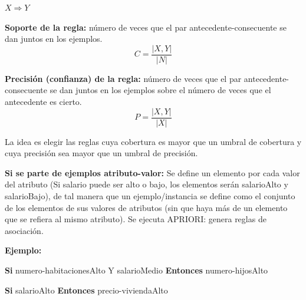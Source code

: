 \documentclass[12pt, twoside, openright]{report} %
\begin{document}
\begin{center}
	$X \Rightarrow Y$
\end{center}

\textbf{Soporte de la regla:} número de veces que el par antecedente-consecuente se dan juntos en los ejemplos.
$$C = \frac{|X, Y|}{|N|}$$

\textbf{Precisión (confianza) de la regla:} número de veces que el par antecedente-consecuente se dan juntos en los ejemplos sobre el número de veces que el antecedente es cierto.
$$P = \frac{|X, Y|}{|X|}$$

La idea es elegir las reglas cuya cobertura es mayor que un umbral de cobertura y cuya precisión sea mayor que un umbral de precisión.

\textbf{Si se parte de ejemplos atributo-valor:} Se define un elemento por cada valor del atributo (Si salario puede ser alto o bajo, los elementos serán salarioAlto y salarioBajo), de tal manera que un ejemplo/instancia se define como el conjunto de los elementos de sus valores de atributos (sin que haya más de un elemento que se refiera al mismo atributo). Se ejecuta APRIORI: genera reglas de asociación.

\textbf{Ejemplo:}

\textbf{Si} numero-habitacionesAlto Y salarioMedio \textbf{Entonces} numero-hijosAlto

\textbf{Si} salarioAlto \textbf{Entonces} precio-viviendaAlto
\end{document}
